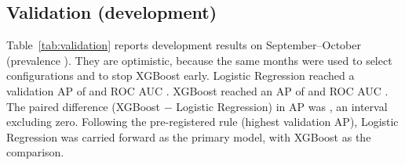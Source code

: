 \documentclass[conference]{IEEEtran}
\begin{document}
\subsection{Validation (development)}

Table~\ref{tab:validation} reports development results on September--October (prevalence
\ValPrev{}). They are optimistic, because the same months were used to select configurations and
to stop XGBoost early. Logistic Regression reached a validation AP of \ValAPLRci{} and ROC AUC
\ValROCLR{}. XGBoost reached an AP of \ValAPXGB{} and ROC AUC \ValROCXGB{}. The paired difference
(XGBoost $-$ Logistic Regression) in AP was \ValDiffAPci{}, an interval excluding zero. Following
the pre-registered rule (highest validation AP), Logistic Regression was carried forward as the
primary model, with XGBoost as the comparison.
\end{document}
